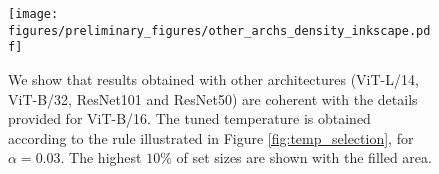 \begin{figure}[t]
    \centering
    \texttt{[image: figures/preliminary\_figures/other\_archs\_density\_inkscape.pdf]}
    \caption{We show that results obtained with other architectures (ViT-L/14, ViT-B/32, ResNet101 and ResNet50) are coherent with the details provided for ViT-B/16. The tuned temperature is obtained according to the rule illustrated in Figure \ref{fig:temp_selection}, for $\alpha = 0.03$. The highest $10\%$ of set sizes are shown with the filled area.}
    \label{fig:other_archs}
\end{figure}